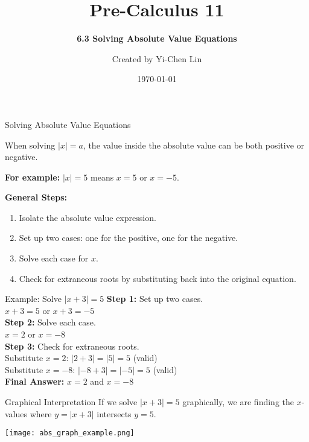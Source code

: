 \documentclass[aspectratio=169]{beamer}
\title{Pre-Calculus 11}
\subtitle{\textbf{6.3 Solving Absolute Value Equations}}
\author{Created by Yi-Chen Lin}
\date{\today}
\begin{document}
\begin{frame}
    \titlepage
    \vfill
  
\end{frame}

\begin{frame}{Solving Absolute Value Equations}
    \begin{tcolorbox}[colback=lightgray,colframe=primary,title=Key Idea]
        \footnotesize
        When solving $|x| = a$, the value inside the absolute value can be both positive or negative.\par
        \vspace{0.5em}
        \textbf{For example:} $|x| = 5$ means $x = 5$ or $x = -5$.
    \end{tcolorbox}
    \vspace{1em}
    \textbf{General Steps:}
    \begin{enumerate}
        \item Isolate the absolute value expression.
        \item Set up two cases: one for the positive, one for the negative.
        \item Solve each case for $x$.
        \item Check for extraneous roots by substituting back into the original equation.
    \end{enumerate}
\end{frame}

\begin{frame}{Example: Solve $|x+3| = 5$}
    \textbf{Step 1:} Set up two cases.\\
    $x+3 = 5$ \hspace{2em} or \hspace{2em} $x+3 = -5$\\[1em]
    \textbf{Step 2:} Solve each case.\\
    $x = 2$ \hspace{2em} or \hspace{2em} $x = -8$\\[1em]
    \textbf{Step 3:} Check for extraneous roots.\\
    Substitute $x=2$: $|2+3| = |5| = 5$ (valid)\\
    Substitute $x=-8$: $|-8+3| = |-5| = 5$ (valid)\\[1em]
    \textbf{Final Answer:} $x = 2$ and $x = -8$
\end{frame}

\begin{frame}{Graphical Interpretation}
    \footnotesize
    If we solve $|x+3|=5$ graphically, we are finding the $x$-values where $y=|x+3|$ intersects $y=5$.
    \begin{center}
        \texttt{[image: abs\_graph\_example.png]} %
    \end{center}
\end{frame}
\end{document}
